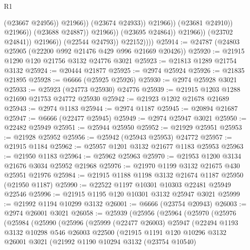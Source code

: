 \begin{lexlean}{R1}
\begin{coremodule}
                                                  (@23667 @24956))
                                                @21966))
                                            (@23674 @24933))
                                          @21966))
                                      (@23681 @24910))
                                    @21966))
                                (@23688 @24887))
                              @21966))
                          (@23695 @24864))
                        @21966))
                    (@23702 @24841))
                  @21966))
              (@22544 @24793))
            @22152))))
@25914 := @24787 (@24803 @25905 (@22200 @992 @21476 @429 @996 @21669 @20426))
@25920 := @21915 @1290 @120 @21756 @3132 @24776 @3021
@25923 := @21813 @1289 @21754 @3132
@25924 := @20444 @21877
@25925 := @2974 @25924
@25926 := @21835 @21895
@25928 := @6666 (@25925 @25926)
@25930 := @2974 @25928 @3021
@25933 := @25923 (@24773 @25930) @24776
@25939 := @21915 @1203 @1288 @21690 @21753 @24772 @25930
@25942 := @21923 @1202 @21678 @21689
@25943 := @2974 @1183
@25944 := @2974 @1187
@25945 := @20894 @21687
@25947 := @6666 (@22477 @25945)
@25949 := @2974 @25947 @3021
@25950 := @22482 @25949
@25951 := @25944 @25950
@25952 := @21929 @25951
@25953 := @21928 @25952
@25956 := @25942 (@25943 @25953) @24772
@25957 := @21915 @1184
@25962 := @25957 @1201 @3132 @21677 @1183 @25953
@25963 := @21950 @1183
@25964 := @25962 @25963
@25970 := @21953 @1200 @3134 @21676 @3034 @25952 @21968
@25976 := @21970 @1199 @3132 @21675 @430 @25951 @21976
@25984 := @21915 @1188 @1198 @3132 @21674 @1187 @25950 (@21950 @1187)
@25990 := @22522 @1197 @10301 @10303 @22481 @25949 @22546
@25996 := @21915 @1195 @120 @10301 @3132 @25947 @3021
@25999 := @21992 @1194 @10299 @3132
@26001 := @6666 (@23754 @20943)
@26003 := @2974 @26001 @3021
@26058 := @25939
    (@25956
      (@25964
        (@25970
          (@25976
            (@25984
              (@25990
                (@25996
                  (@25999
                    (@22477 @26003)
                    @25947
                    (@22494
                      @1193
                      @3132
                      @10298
                      @546
                      @26003
                      @22500
                      (@21915
                        @1191
                        @120
                        @10296
                        @3132
                        @26001
                        @3021
                        (@21992
                          @1190
                          @10294
                          @3132
                          (@23754 @10540)

\end{coremodule}
\end{lexlean}
